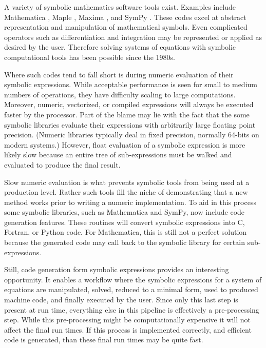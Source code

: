 \documentclass[preprint,12pt]{elsarticle}
\begin{document}
A variety of symbolic mathematics software tools exist. Examples include  
Mathematica \cite{Wolfram2008}, Maple \cite{Maple16},  Maxima \cite{Maxima5}, 
and SymPy \cite{SymPy2012}.  These codes excel at abstract representation and 
manipulation of mathematical symbols.  Even complicated operators such as 
differentiation and integration may be represented or applied as desired by the 
user.  Therefore solving systems of equations with symbolic computational tools
has been possible since the 1980s.

Where such codes tend to fall short is during numeric evaluation of 
their symbolic expressions.  While acceptable performance is seen 
for small to medium numbers of 
operations, they have difficulty scaling to large computations.  Moreover, 
numeric, vectorized, or compiled expressions will always be executed faster
by the processor.  Part of the blame may lie with the fact that the some symbolic 
libraries evaluate their 
expressions with arbitrarily large floating point precision.  (Numeric libraries
typically deal in fixed precision, normally 64-bits on modern systems.)  However, 
float evaluation of a symbolic expression is more likely slow because an entire 
tree of sub-expressions must be walked and evaluated to produce the final result.

Slow numeric evaluation is what prevents symbolic tools from being used at a 
production level.  Rather such tools fill the niche of demonstrating that a new
method works prior to writing a numeric implementation.  To aid in this 
process some symbolic libraries, such as Mathematica and SymPy, now include
code generation features.  These routines will convert symbolic expressions into
C, Fortran, or Python code.  For Mathematica, this is still not a perfect solution
because the generated code may call back to the symbolic library for certain 
sub-expressions.

Still, code generation form symbolic expressions provides an interesting opportunity. 
It enables a workflow 
where the symbolic expressions for a system of equations are manipulated, solved, 
reduced to a minimal form, used to produced machine code, and finally executed by
the user.  Since only this last step is present at run time, everything else in this
pipeline is effectively a pre-processing step.  While this pre-processing might be 
computationally expensive it will not affect the final run times.  If this
process is implemented correctly, and efficient code is generated, than these 
final run times may be quite fast.
\end{document}
